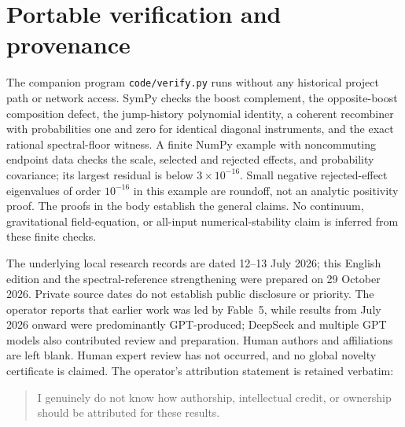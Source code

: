 \documentclass[11pt]{article}
\theoremstyle{remark}
\begin{document}
\section{Portable verification and provenance}
The companion program \texttt{code/verify.py} runs without any historical project
path or network access.
SymPy checks the boost complement, the opposite-boost composition defect, the
jump-history polynomial identity, a coherent recombiner with probabilities one
and zero for identical diagonal instruments, and the exact rational
spectral-floor witness.
A finite NumPy example with noncommuting endpoint data checks the scale,
selected and rejected effects, and probability covariance; its largest
residual is below $3\times10^{-16}$.
Small negative rejected-effect eigenvalues of order $10^{-16}$ in this example
are roundoff, not an analytic positivity proof.
The proofs in the body establish the general claims.
No continuum, gravitational field-equation, or all-input numerical-stability
claim is inferred from these finite checks.

The underlying local research records are dated 12--13 July 2026; this
English edition and the spectral-reference strengthening were prepared on
29 October 2026.
Private source dates do not establish public disclosure or priority.
The operator reports that earlier work was led by Fable~5, while results from
July 2026 onward were predominantly GPT-produced; DeepSeek and multiple GPT
models also contributed review and preparation.
Human authors and affiliations are left blank.
Human expert review has not occurred, and no global novelty certificate is
claimed.
The operator's attribution statement is retained verbatim:
\begin{quote}
I genuinely do not know how authorship, intellectual credit, or ownership
should be attributed for these results.
\end{quote}



\end{document}
